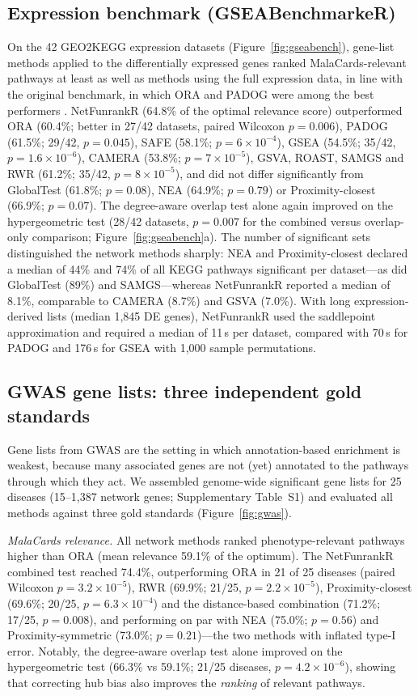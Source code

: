 \subsection{Expression benchmark (GSEABenchmarkeR)}\label{res:gseabench}
On the 42 GEO2KEGG expression datasets (Figure~\ref{fig:gseabench}), gene-list methods applied to the differentially expressed genes ranked MalaCards-relevant pathways at least as well as methods using the full expression data, in line with the original benchmark, in which ORA and PADOG were among the best performers \citep{Geistlinger2021}. NetFunrankR (64.8\% of the optimal relevance score) outperformed ORA (60.4\%; better in 27/42 datasets, paired Wilcoxon $p = 0.006$), PADOG (61.5\%; 29/42, $p = 0.045$), SAFE (58.1\%; $p = 6\times10^{-4}$), GSEA (54.5\%; 35/42, $p = 1.6\times10^{-6}$), CAMERA (53.8\%; $p = 7\times10^{-5}$), GSVA, ROAST, SAMGS and RWR (61.2\%; 35/42, $p = 8\times10^{-5}$), and did not differ significantly from GlobalTest (61.8\%; $p = 0.08$), NEA (64.9\%; $p = 0.79$) or Proximity-closest (66.9\%; $p = 0.07$). The degree-aware overlap test alone again improved on the hypergeometric test (28/42 datasets, $p = 0.007$ for the combined versus overlap-only comparison; Figure~\ref{fig:gseabench}a). The number of significant sets distinguished the network methods sharply: NEA and Proximity-closest declared a median of 44\% and 74\% of all KEGG pathways significant per dataset---as did GlobalTest (89\%) and SAMGS---whereas NetFunrankR reported a median of 8.1\%, comparable to CAMERA (8.7\%) and GSVA (7.0\%). With long expression-derived lists (median 1{,}845 DE genes), NetFunrankR used the saddlepoint approximation and required a median of 11\,s per dataset, compared with 70\,s for PADOG and 176\,s for GSEA with 1{,}000 sample permutations.

\subsection{GWAS gene lists: three independent gold standards}\label{res:gwas}
Gene lists from GWAS are the setting in which annotation-based enrichment is weakest, because many associated genes are not (yet) annotated to the pathways through which they act. We assembled genome-wide significant gene lists for 25 diseases (15--1{,}387 network genes; Supplementary Table~S1) and evaluated all methods against three gold standards (Figure~\ref{fig:gwas}).

\emph{MalaCards relevance.} All network methods ranked phenotype-relevant pathways higher than ORA (mean relevance 59.1\% of the optimum). The NetFunrankR combined test reached 74.4\%, outperforming ORA in 21 of 25 diseases (paired Wilcoxon $p = 3.2\times10^{-5}$), RWR (69.9\%; 21/25, $p = 2.2\times10^{-5}$), Proximity-closest (69.6\%; 20/25, $p = 6.3\times10^{-4}$) and the distance-based combination (71.2\%; 17/25, $p = 0.008$), and performing on par with NEA (75.0\%; $p = 0.56$) and Proximity-symmetric (73.0\%; $p = 0.21$)---the two methods with inflated type-I error. Notably, the degree-aware overlap test alone improved on the hypergeometric test (66.3\% vs 59.1\%; 21/25 diseases, $p = 4.2\times10^{-6}$), showing that correcting hub bias also improves the \emph{ranking} of relevant pathways.

